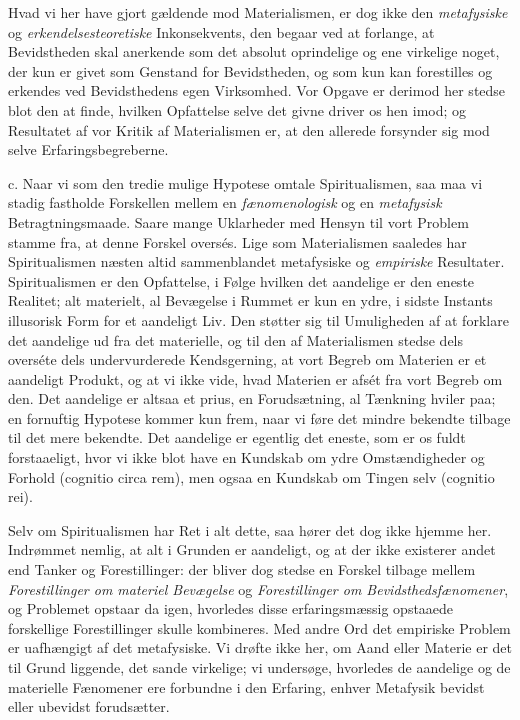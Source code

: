 \documentclass[12pt,a4paper,openany]{book}
\newcommand{\opage}[1]{\marginnote{\footnotesize\textit{[#1]}}}
\begin{document}
Hvad vi her have gjort gældende mod Materialismen, er dog ikke den
\emph{metafysiske} og \emph{erkendelsesteoretiske} Inkonsekvents, den
begaar ved at forlange, at Bevidstheden skal anerkende som det absolut
oprindelige og ene virkelige noget, der kun er givet som Genstand for
Bevidstheden, og som kun kan forestilles og erkendes ved Bevidsthedens
egen Virksomhed. Vor Opgave er derimod her stedse blot den at finde,
hvilken Opfattelse selve det givne driver os hen imod; og Resultatet af
vor Kritik af Materialismen er, at den allerede forsynder sig mod selve
Erfaringsbegreberne.

c. Naar vi som den tredie mulige Hypotese omtale Spiritualismen, saa maa
vi stadig fastholde Forskellen mellem en \emph{fænomenologisk} og en
\emph{metafysisk} Betragtningsmaade. Saare mange Uklarheder med Hensyn
til vort Problem stamme fra, at denne Forskel oversés. Lige som
Materialismen saaledes har Spiritualismen næsten altid sammenblandet
metafysiske og \emph{empiriske} Resultater. Spiritualismen er den
Opfattelse, i Følge hvilken det aandelige er den eneste Realitet; alt
materielt, al Bevægelse i Rummet er kun en ydre, i sidste Instants
illusorisk Form for et aandeligt Liv. Den støtter sig til Umuligheden af
at forklare det aandelige ud fra det materielle, og til den af
Materialismen stedse dels overséte dels undervurderede Kendsgerning, at
vort Begreb om Materien er et aandeligt Produkt, og at vi ikke vide,
hvad Materien er afsét fra vort Begreb om den. Det aandelige er altsaa
et prius, en Forudsætning, al Tænkning hviler paa; en fornuftig Hypotese
kommer kun frem, naar vi føre det mindre bekendte tilbage til det mere
bekendte. Det aandelige er egentlig det eneste, som er os fuldt
forstaaeligt, hvor vi ikke blot have en Kundskab om ydre Omstændigheder
og Forhold (cognitio circa rem), men ogsaa en Kundskab om Tingen selv
(cognitio rei).

Selv om Spiritualismen har Ret i alt dette, saa hører det dog ikke
hjemme her. Indrømmet nemlig, at alt i Grunden er aandeligt, og at der
ikke existerer andet end Tanker og
\opage{75}Forestillinger: der bliver dog stedse en Forskel tilbage
mellem \emph{Forestillinger om materiel Bevægelse} og
\emph{Forestillinger om Bevidsthedsfænomener}, og Problemet opstaar da
igen, hvorledes disse erfaringsmæssig opstaaede forskellige
Forestillinger skulle kombineres. Med andre Ord det empiriske Problem er
uafhængigt af det metafysiske. Vi drøfte ikke her, om Aand eller Materie
er det til Grund liggende, det sande virkelige; vi undersøge, hvorledes
de aandelige og de materielle Fænomener ere forbundne i den Erfaring,
enhver Metafysik bevidst eller ubevidst forudsætter.
\end{document}

